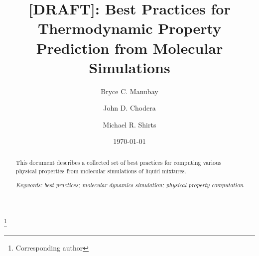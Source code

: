 \documentclass[aps,pre,twocolumn,nofootinbib,superscriptaddress,linenumbers,10pt, draft,tightenlines]{revtex4-1}
\begin{document}


\title{[DRAFT]: Best Practices for Thermodynamic Property Prediction from Molecular Simulations}

\author{Bryce C. Manubay} 

\author{John D. Chodera}

\author{Michael R. Shirts}
\thanks{Corresponding author}

\date{\today}


\begin{abstract}
This document describes a collected set of best practices for computing various physical properties from molecular simulations of liquid mixtures.

\emph{Keywords: best practices; molecular dynamics simulation; physical property computation}


\end{abstract}
\maketitle

\listoftodos

\end{document}
